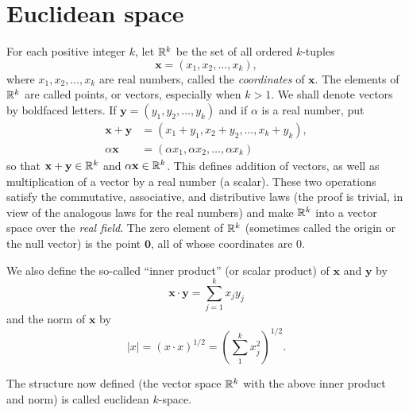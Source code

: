 \section{Euclidean space}

\begin{mydef}
    \label{mydef:1.36}
    For each positive integer $k$,
    let ${\protect\mathbb R}^k$ be the set of all ordered $k$-tuples
    \begin{equation*}
        \mathbf{x} = \left(x_1,x_2,\dots,x_k\right),
    \end{equation*}
    where $x_1,x_2,\dots,x_k$ are real numbers, called the \emph{coordinates} of $\mathbf{x}$.
    The elements of ${\protect\mathbb R}^k$ are called points, or vectors,
    especially when $k > 1$. We shall denote vectors
    by boldfaced letters.
    If $\mathbf{y} = \left(y_1,y_2,\dots,y_k\right)$
    and if $\alpha$ is a real number, put
    \begin{align*}
        \mathbf{x} + \mathbf{y} & = \left(x_1+y_1,x_2+y_2,\dots,x_k+y_k\right),         \\
        \alpha\mathbf{x}        & = \left(\alpha x_1,\alpha x_2,\dots,\alpha x_k\right)
    \end{align*}
    so that $\mathbf{x} +\mathbf{y} \in {\protect\mathbb R}^k$ and $\alpha\mathbf{x} \in {\protect\mathbb R}^k$.
    This defines addition of vectors,
    as well as multiplication of a vector by a real number (a scalar).
    These two operations satisfy the commutative, associative,
    and distributive laws
    (the proof is trivial, in view of the analogous laws for the real numbers)
    and make ${\protect\mathbb R}^k$ into a vector space over the \emph{real field}.
    The zero element of ${\protect\mathbb R}^k$ (sometimes called the origin or the null vector) is the point $\mathbf{0}$,
    all of whose coordinates are $0$.

    We also define the so-called ``inner product'' (or scalar product) of $\mathbf{x}$ and $\mathbf{y}$ by
    \begin{equation*}
        \mathbf{x}\cdot\mathbf{y} = \sum_{j=1}^{k}x_j y_j
    \end{equation*}
    and the norm of $\mathbf{x}$ by
    \begin{equation*}
        |x| = (x\cdot x)^{1/2} = \left( \sum_{1}^{k} x_j^2 \right)^{1/2}.
    \end{equation*}

    The structure now defined (the vector space ${\protect\mathbb R}^k$ with the above inner product and norm) is called euclidean $k$-space.
\end{mydef}

